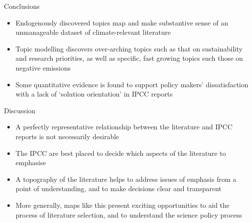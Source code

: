 \documentclass[9pt]{beamer}
\begin{document}
\begin{frame}{Conclusions}


\begin{itemize}
	\item<1-> Endogenously discovered topics map and make substantive sense of an unmanageable dataset of climate-relevant literature
	\item<2-> Topic modelling discovers over-arching topics such as that on sustainability and research priorities, as well as specific, fast growing topics such those on negative emissions
	\item<3-> Some quantitative evidence is found to support policy makers' dissatisfaction with a lack of `solution orientation' in IPCC reports \citep{Kowarsch2017} 
\end{itemize}

\end{frame}

\begin{frame}{Discussion}


\begin{itemize}
\item<1-> A perfectly representative relationship between the literature and IPCC reports is not necessarily desirable
\item<2-> The IPCC are best placed to decide which aspects of the literature to emphasise
\item<3-> A topography of the literature helps to address issues of emphasis from a point of understanding, and to make decisions clear and transparent
\item<4-> More generally, maps like this present exciting opportunities to aid the process of literature selection, and to understand the science policy process
\end{itemize}

\end{frame}
\end{document}
